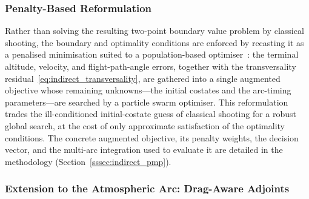 \subsubsection{Penalty-Based Reformulation}

Rather than solving the resulting two-point boundary value problem by classical shooting, the boundary and optimality conditions are enforced by recasting it as a penalised minimisation suited to a population-based optimiser~\cite{Morgado2022_MultistagePrelimDesignTrajectoryOpt}: the terminal altitude, velocity, and flight-path-angle errors, together with the transversality residual~\eqref{eq:indirect_transversality}, are gathered into a single augmented objective whose remaining unknowns---the initial costates and the arc-timing parameters---are searched by a particle swarm optimiser. This reformulation trades the ill-conditioned initial-costate guess of classical shooting for a robust global search, at the cost of only approximate satisfaction of the optimality conditions. The concrete augmented objective, its penalty weights, the decision vector, and the multi-arc integration used to evaluate it are detailed in the methodology (Section~\ref{sssec:indirect_pmp}).


\subsubsection{Extension to the Atmospheric Arc: Drag-Aware Adjoints}
\label{sssec:fa_drag}

